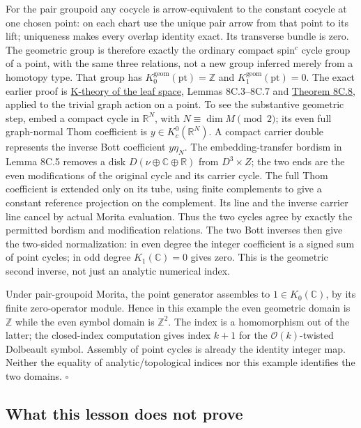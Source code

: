 \documentclass[
  11pt,
]{article}
\begin{document}
For the pair groupoid any cocycle is arrow-equivalent to the constant
cocycle at one chosen point: on each chart use the unique pair arrow
from that point to its lift; uniqueness makes every overlap identity
exact. Its transverse bundle is zero. The geometric group is therefore
exactly the ordinary compact spin\(^{c}\) cycle group of a point, with
the same three relations, not a new group inferred merely from a
homotopy type. That group has
\(K_0^{\mathrm{geom}}(\mathrm{pt})=\mathbb Z\) and
\(K_1^{\mathrm{geom}}(\mathrm{pt})=0\). The exact earlier proof is
\href{../NCG-FOLIATIONS/k-theory-of-the-leaf-space.html\#section-6}{K-theory
of the leaf space}, Lemmas 8C.3--8C.7 and
\href{../NCG-FOLIATIONS/k-theory-of-the-leaf-space.html\#section-8c}{Theorem
8C.8}, applied to the trivial graph action on a point. To see the
substantive geometric step, embed a compact cycle in \(\mathbb R^N\),
with \(N\equiv\dim M\pmod2\); its even full graph-normal Thom
coefficient is \(y\in K_c^0(\mathbb R^N)\). A compact carrier double
represents the inverse Bott coefficient \(y\eta_N\). The
embedding-transfer bordism in Lemma 8C.5 removes a disk
\(D(\nu\oplus\mathbb C\oplus\mathbb R)\) from \(D^3\times Z\); the two
ends are the even modifications of the original cycle and its carrier
cycle. The full Thom coefficient is extended only on its tube, using
finite complements to give a constant reference projection on the
complement. Its line and the inverse carrier line cancel by actual
Morita evaluation. Thus the two cycles agree by exactly the permitted
bordism and modification relations. The two Bott inverses then give the
two-sided normalization: in even degree the integer coefficient is a
signed sum of point cycles; in odd degree \(K_1(\mathbb C)=0\) gives
zero. This is the geometric second inverse, not just an analytic
numerical index.

Under pair-groupoid Morita, the point generator assembles to
\(1\in K_0(\mathbb C)\), by its finite zero-operator module. Hence in
this example the even geometric domain is \(\mathbb Z\) while the even
symbol domain is \(\mathbb Z^2\). The index is a homomorphism out of the
latter; the closed-index computation gives index \(k+1\) for the
\(\mathcal O(k)\)-twisted Dolbeault symbol. Assembly of point cycles is
already the identity integer map. Neither the equality of
analytic/topological indices nor this example identifies the two
domains. \(\square\)

\subsection{What this lesson does not
prove}\label{what-this-lesson-does-not-prove}
\end{document}
